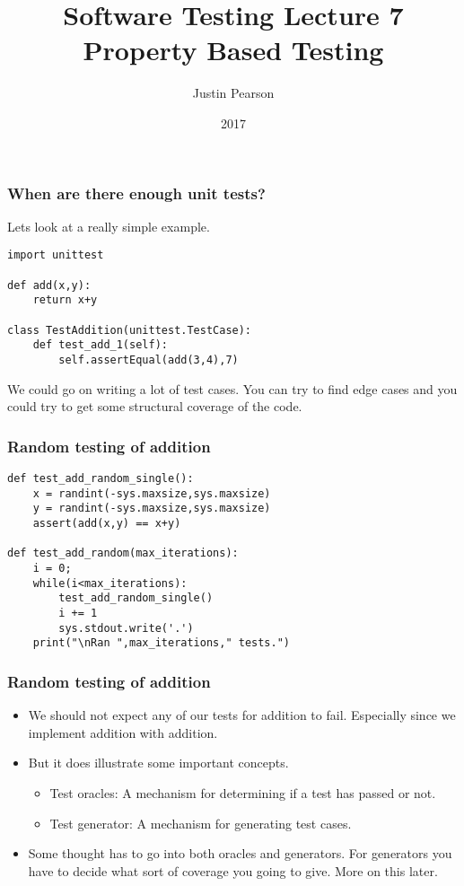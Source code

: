\documentclass{beamer}
\title{Software Testing  Lecture 7 \\ Property Based Testing}
\author{Justin Pearson}
\date{2017}
\begin{document}
\lstset{language=Python}

\begin{frame}
  \maketitle
\end{frame}

\begin{frame}[fragile]
  \frametitle{When are there enough unit tests?}
  Lets look at a really simple example.
  \begin{lstlisting}
import unittest

def add(x,y):
    return x+y

class TestAddition(unittest.TestCase):
    def test_add_1(self):
        self.assertEqual(add(3,4),7)

      \end{lstlisting}
We could go on writing a lot of test cases. You can try to find edge cases and
you could try to get some structural coverage of the code. 
\end{frame}
\begin{frame}[fragile]
  \frametitle{Random testing of addition}
  \begin{lstlisting}
def test_add_random_single():
    x = randint(-sys.maxsize,sys.maxsize)
    y = randint(-sys.maxsize,sys.maxsize)
    assert(add(x,y) == x+y)

def test_add_random(max_iterations):
    i = 0;
    while(i<max_iterations):
        test_add_random_single()
        i += 1
        sys.stdout.write('.')
    print("\nRan ",max_iterations," tests.")
  \end{lstlisting}
\end{frame}
\begin{frame}
  \frametitle{Random testing of addition}
  \begin{itemize}
  \item We should not expect any of our tests for addition to
    fail. Especially since we implement addition with addition.
  \item But it does illustrate some important concepts.
    \begin{itemize}
    \item Test oracles: A mechanism for determining if a test has passed or
      not.
    \item Test generator: A mechanism for generating test cases. 
      
    \end{itemize}
  \item Some thought has to go into both oracles and generators. For
    generators you have to decide what sort of coverage you going to
    give. More on this later.
  \end{itemize}
  
\end{frame}
\end{document}
